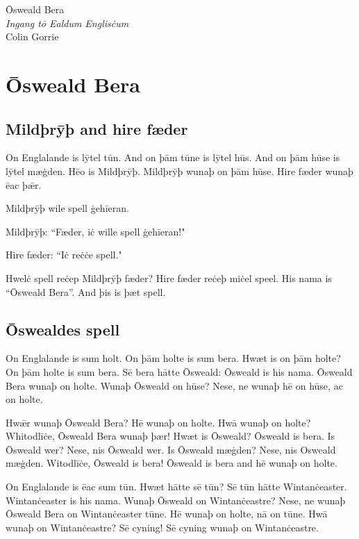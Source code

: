 \documentclass[11pt, openany]{book}
\begin{document}
\begin{titlepage}
  \centering
  \vspace*{2cm}
  {\Huge\OldEnglish Ōsweald Bera}\\[1em]
  {\Large\itshape Ingang tō Ealdum Englisċum}\\[3em]
  {\large Colin Gorrie}
  \vfill
\end{titlepage}

\tableofcontents

\mainmatter

\chapter{Ōsweald Bera}
\section{Mildþrȳþ and hire fæder}
On Englalande is lȳtel tūn. And on þām tūne is lȳtel hūs. And on þām hūse is lȳtel mæġden. Hēo is Mildþrȳþ. Mildþrȳþ wunaþ on þām hūse. Hire fæder wunaþ ēac þǣr. 

Mildþrȳþ wile spell ġehīeran.

Mildþrȳþ: ``Fæder, iċ wille spell ġehīeran!"

Hire fæder: ``Iċ reċċe spell."

Hwelċ spell reċep Mildþrȳþ fæder? Hire fæder reċeþ miċel speel. His nama is ``Ōsweald Bera''. And þis is þæt spell. 

\section{Ōswealdes spell}

On Englalande is sum holt. On þām holte is sum bera. Hwæt is on þām holte? On þām holte is sum bera. Sē bera hātte Ōsweald: Ōsweald is his nama. Ōsweald Bera wunaþ on holte. Wunaþ Ōsweald on hūse? Nese, ne wunaþ hē on hūse, ac on holte. 

Hwǣr wunaþ Ōsweald Bera? Hē wunaþ on holte. Hwā wunaþ on holte? Whitodlīċe, Ōsweald Bera wunaþ þær! Hwæt is Ōsweald? Ōsweald is bera. Is Ōsweald wer? Nese, nis Ōsweald wer. Is Ōsweald mæġden? Nese, nis Osweald mæġden. Witodlīċe, Ōsweald is bera! Ōsweald is bera and hē wunaþ on holte.

On Englalande is ēac sum tūn. Hwæt hātte sē tūn? Sē tūn hātte Wintanċeaster. Wintanċeaster is his nama. Wunaþ Ōsweald on Wintanċeastre? Nese, ne wunaþ Ōsweald Bera on Wintanċeaster tūne. Hē wunaþ on holte, nā on tūne. Hwā wunaþ on Wintanċeastre? Sē cyning! Sē cyning wunaþ on Wintanċeastre. 
\end{document}
